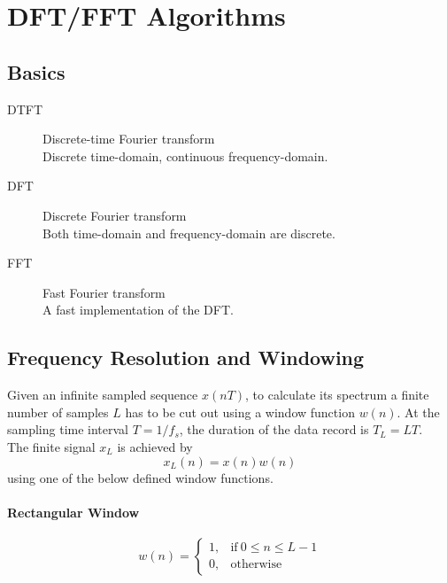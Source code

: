 \section{DFT/FFT Algorithms}

\subsection{Basics}

\begin{description}
	\item[DTFT] Discrete-time Fourier transform \\
		Discrete time-domain, continuous frequency-domain.
	\item[DFT] Discrete Fourier transform \\
		Both time-domain and frequency-domain are discrete.
	\item[FFT] Fast Fourier transform \\
		A fast implementation of the DFT.
\end{description}

\subsection{Frequency Resolution and Windowing}

Given an infinite sampled sequence $x(nT)$, to calculate its spectrum a finite
number of samples $L$ has to be cut out using a window function $w(n)$.
At the sampling time interval $T = 1/f_s$, the duration of the data record
is $T_L = LT$. \\

The finite signal $x_L$ is achieved by
\begin{equation*}
	x_L(n) = x(n) w(n)
\end{equation*}
using one of the below defined window functions. \\

\paragraph{Rectangular Window}
	\begin{equation*}
		w(n) = \begin{cases}
			1, & \text{if} \: 0 \leq n \leq L-1 \\
			0, & \text{otherwise}
		\end{cases}
	\end{equation*}

